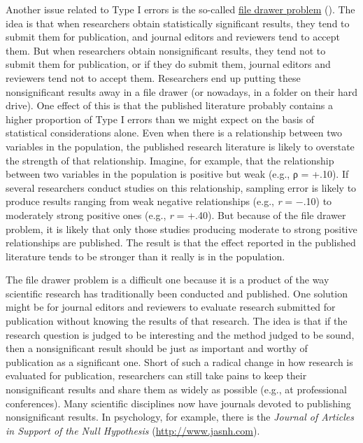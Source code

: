 \documentclass[
]{krantz}
\begin{document}
Another issue related to Type I errors is the so-called \hyperref[file-drawer-problem]{file drawer problem} (). The idea is that when researchers obtain statistically significant results, they tend to submit them for publication, and journal editors and reviewers tend to accept them. But when researchers obtain nonsignificant results, they tend not to submit them for publication, or if they do submit them, journal editors and reviewers tend not to accept them. Researchers end up putting these nonsignificant results away in a file drawer (or nowadays, in a folder on their hard drive). One effect of this is that the published literature probably contains a higher proportion of Type I errors than we might expect on the basis of statistical considerations alone. Even when there is a relationship between two variables in the population, the published research literature is likely to overstate the strength of that relationship. Imagine, for example, that the relationship between two variables in the population is positive but weak (e.g., ρ = +.10). If several researchers conduct studies on this relationship, sampling error is likely to produce results ranging from weak negative relationships (e.g., \emph{r} = −.10) to moderately strong positive ones (e.g., \emph{r} = +.40). But because of the file drawer problem, it is likely that only those studies producing moderate to strong positive relationships are published. The result is that the effect reported in the published literature tends to be stronger than it really is in the population.

The file drawer problem is a difficult one because it is a product of the way scientific research has traditionally been conducted and published. One solution might be for journal editors and reviewers to evaluate research submitted for publication without knowing the results of that research. The idea is that if the research question is judged to be interesting and the method judged to be sound, then a nonsignificant result should be just as important and worthy of publication as a significant one. Short of such a radical change in how research is evaluated for publication, researchers can still take pains to keep their nonsignificant results and share them as widely as possible (e.g., at professional conferences). Many scientific disciplines now have journals devoted to publishing nonsignificant results. In psychology, for example, there is the \emph{Journal of Articles in Support of the Null Hypothesis} (\url{http://www.jasnh.com}).
\end{document}
